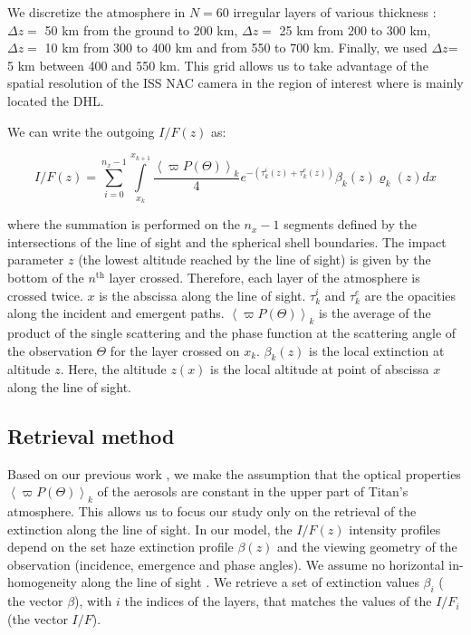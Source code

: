 We discretize the atmosphere in $N=60$ irregular layers of various thickness : $\Delta z =$ 50 km from the
ground to 200 km, $\Delta z =$ 25 km from 200 to 300 km, $\Delta z =$ 10 km from 300 to 400 km and from 550 to 700 km.
Finally, we used $\Delta z$= 5 km between 400 and 550 km. This grid allows us to take advantage of the spatial resolution
of the ISS NAC camera in the region of interest where is mainly located the DHL.

We can write the outgoing $I/F (z)$ as:

\begin{equation}
I/F (z) = \sum_{i=0}^{n_x-1} \int\limits_{x_k}^{x_{k+1}}
\frac{\left< \varpi P(\Theta) \right>_k}{4}
e^{-\left( \tau^i_k\left(z\right) + \tau^e_k\left(z\right) \right)}
\beta_k\left(z\right) \varrho_k\left(z\right) d{x}
\label{eq:west2017_sup_limb}
\end{equation}

where the summation is performed on the $n_x-1$ segments defined by the intersections of the line of sight and the
spherical shell boundaries. The impact parameter $z$ (the lowest altitude reached by the line of sight) is given by the
bottom of the $n^\mathrm{th}$ layer crossed. Therefore, each layer of the atmosphere is crossed twice. $x$ is the
abscissa along the line of sight. $\tau^i_k$ and $\tau^e_k$ are the opacities along the incident and emergent paths.
$\left< \varpi P(\Theta)\right>_k$ is the average of the product of the single scattering and the phase function
at the scattering angle of the observation $\Theta$ for the layer crossed on $x_k$.  $\beta_k(z)$ is the local
extinction at altitude $z$. Here, the altitude $z(x)$ is the local altitude at point of abscissa $x$ along the
line of sight.


\subsection{Retrieval method}

Based on our previous work \citep{Seignovert2017, West2018}, we make the assumption that the optical properties
$\left<\varpi P(\Theta)\right>_k$ of the aerosols are constant in the upper part of Titan's atmosphere. This allows
us to focus our study only on the retrieval of the extinction along the line of sight.
In our model, the $I/F (z)$ intensity profiles depend on the set haze extinction profile $\beta(z)$ and the viewing
geometry of the observation (incidence, emergence and phase angles).
We assume no horizontal in-homogeneity along the line of sight \citep{Seignovert2017}. We retrieve a set of extinction values $\beta_i$ (
the vector ${\beta}$), with $i$ the indices of the layers, that matches the values of the $I/F_i$
(the vector $I/F$).

